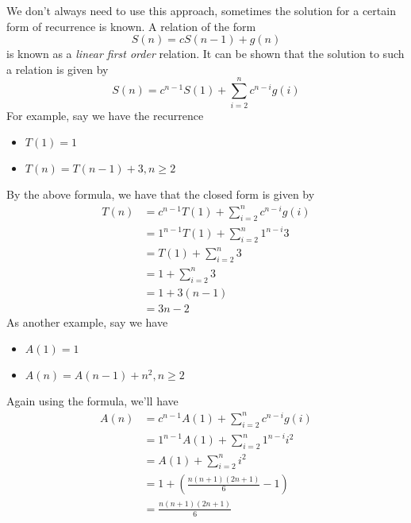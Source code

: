 \documentclass[nobib]{tufte-handout}
\begin{document}
We don't always need to use this approach, sometimes 
the solution for a certain form of recurrence is known. A relation of the form 
\[S(n) = cS(n-1) + g(n)\]
is known as a \emph{linear first order} relation.
It can be shown that the 
solution to such a relation is given by 
\[S(n) = c^{n-1}S(1) + \sum_{i=2}^{n} c^{n-i} g(i)\]
For example, say we have the recurrence 
\begin{itemize}
    \item $T(1) = 1$
    \item $T(n) = T(n-1) + 3, n \geq 2$
\end{itemize}
By the above formula, we have that the closed form is given by 
\begin{align*}
    T(n) &= c^{n-1}T(1) + \sum_{i=2}^{n} c^{n-i} g(i) \\
    &= 1^{n-1}T(1) + \sum_{i=2}^{n} 1^{n-i} 3 \\
    &= T(1) + \sum_{i=2}^{n} 3 \\
    &= 1 + \sum_{i=2}^{n} 3 \\
    &= 1 + 3(n-1) \\
    &= 3n - 2
\end{align*}
As another example, say we have 
\begin{itemize}
    \item $A(1) = 1$
    \item $A(n) = A(n-1) + n^2, n \geq 2$
\end{itemize}
Again using the formula, we'll have 
\begin{align*}
    A(n) &= c^{n-1}A(1) + \sum_{i=2}^{n} c^{n-i} g(i) \\
    &= 1^{n-1}A(1) + \sum_{i=2}^{n} 1^{n-i} i^2 \\
    &= A(1) + \sum_{i=2}^{n} i^2 \\
    &= 1 + \left(\frac{n(n+1)(2n+1)}{6} - 1 \right) \\
    &= \frac{n(n+1)(2n+1)}{6}
\end{align*}
\end{document}
